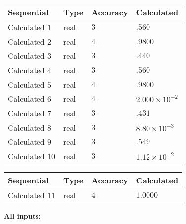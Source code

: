 \documentclass[12pt]{article}
\begin{document}
  
\noindent\begin{tabular}{|l|l|l|l|}
\hline
 Sequential & Type & Accuracy & Calculated \\ 
\hline
 
 
  Calculated $           1$ & real & $           3 $ & 
 $ .560 $ 
 \\  \hline  
 
 
  Calculated $           2$ & real & $           4 $ & 
 $ .9800 $ 
 \\  \hline  
 
 
  Calculated $           3$ & real & $           3 $ & 
 $ .440 $ 
 \\  \hline  
 
 
  Calculated $           4$ & real & $           3 $ & 
 $ .560 $ 
 \\  \hline  
 
 
  Calculated $           5$ & real & $           4 $ & 
 $ .9800 $ 
 \\  \hline  
 
 
  Calculated $           6$ & real & $           4 $ & 
 $ 2.000 \times 10^{-2} $ 
 \\  \hline  
 
 
  Calculated $           7$ & real & $           3 $ & 
 $ .431 $ 
 \\  \hline  
 
 
  Calculated $           8$ & real & $           3 $ & 
 $ 8.80 \times 10^{-3} $ 
 \\  \hline  
 
 
  Calculated $           9$ & real & $           3 $ & 
 $ .549 $ 
 \\  \hline  
 
 
  Calculated $          10$ & real & $           3 $ & 
 $ 1.12 \times 10^{-2} $ 
 \\  \hline  
 \end{tabular}
   
   
  
  
\noindent\begin{tabular}{|l|l|l|l|}
\hline
 Sequential & Type & Accuracy & Calculated \\ 
\hline
 
 
  Calculated $          11$ & real & $           4 $ & 
 $ 1.0000 $ 
 \\  \hline  
 \end{tabular}
   
   
   
   
\noindent\vspace{0.1in}\hspace{-0.08in} {\textbf{\Large{All inputs: }}}
   
\end{document}
